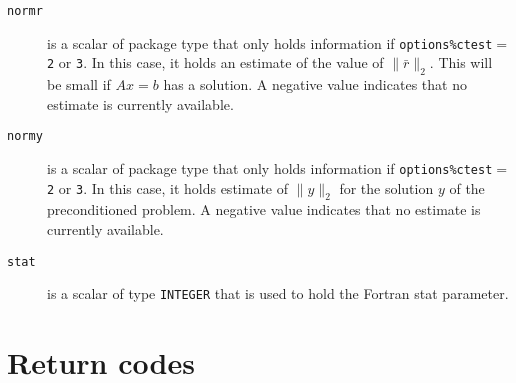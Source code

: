 \begin{description}
\item[\texttt{normr}] is a scalar of package type that
     only holds information if {\tt options\%ctest}$ =${\tt 2} or {\tt 3}.
     In this case, it holds an estimate of the  value of $\|\bar{r}\|_2$.
     This will be small if $Ax = b$ has a solution. A negative value
     indicates that no estimate is currently available.
    
\item[\texttt{normy}] is a scalar of package type that
     only holds information if {\tt options\%ctest}$ =${\tt 2} or {\tt 3}.
     In this case, it holds estimate of  $\|y\|_2$ for the  solution $y$
     of the preconditioned problem.
     A negative value indicates that no estimate is currently available.

\item[\texttt{stat}] is a scalar of type  {\tt INTEGER} that is used to hold the
Fortran stat parameter.

\end{description}



\section{Return codes} \label{LSMR:errors}

